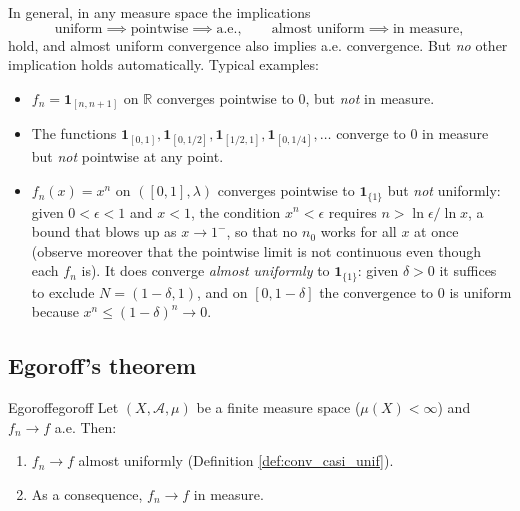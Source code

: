 \documentclass[11pt, a4paper]{article}
\begin{document}
\obs In general, in any measure space the implications
$$ \text{uniform} \implies \text{pointwise} \implies \text{a.e.}, \qquad
   \text{almost uniform} \implies \text{in measure}, $$
hold, and almost uniform convergence also implies a.e. convergence.
But \emph{no} other implication holds automatically. Typical examples:
\begin{itemize}
    \item $f_n = \mathbf{1}_{[n, n+1]}$ on $\mathbb{R}$ converges pointwise
     to 0, but \emph{not} in measure.
    \item The functions $\mathbf{1}_{[0,1]}, \mathbf{1}_{[0,1/2]},
    \mathbf{1}_{[1/2,1]}, \mathbf{1}_{[0,1/4]}, \dots$ converge to 0 in measure but \emph{not}
    pointwise at any point.
    \item $f_n(x) = x^n$ on $([0, 1], \lambda)$ converges pointwise to $\mathbf{1}_{\{1\}}$
    but \emph{not} uniformly: given $0 < \epsilon < 1$ and $x < 1$, the condition
    $x^n < \epsilon$ requires $n > \ln \epsilon / \ln x$, a bound that blows up as $x \to 1^-$, so
    that no $n_0$ works for all $x$ at once (observe moreover that the pointwise
    limit is not continuous even though each $f_n$ is). It does converge \emph{almost uniformly} to
    $\mathbf{1}_{\{1\}}$: given $\delta > 0$ it suffices to exclude $N = (1 - \delta, 1)$, and on
    $[0, 1 - \delta]$ the convergence to $0$ is uniform because $x^n \le (1 - \delta)^n \to 0$.
\end{itemize}

\subsection{Egoroff's theorem}

\begin{teorema}{Egoroff}{egoroff}
Let $(X, \mathcal{A}, \mu)$ be a finite measure space ($\mu(X) < \infty$) and $f_n \to f$ a.e.
Then:
\begin{enumerate}
    \item $f_n \to f$ almost uniformly (Definition \ref{def:conv_casi_unif}).
    \item As a consequence, $f_n \to f$ in measure.
\end{enumerate}
\end{teorema}
\end{document}
